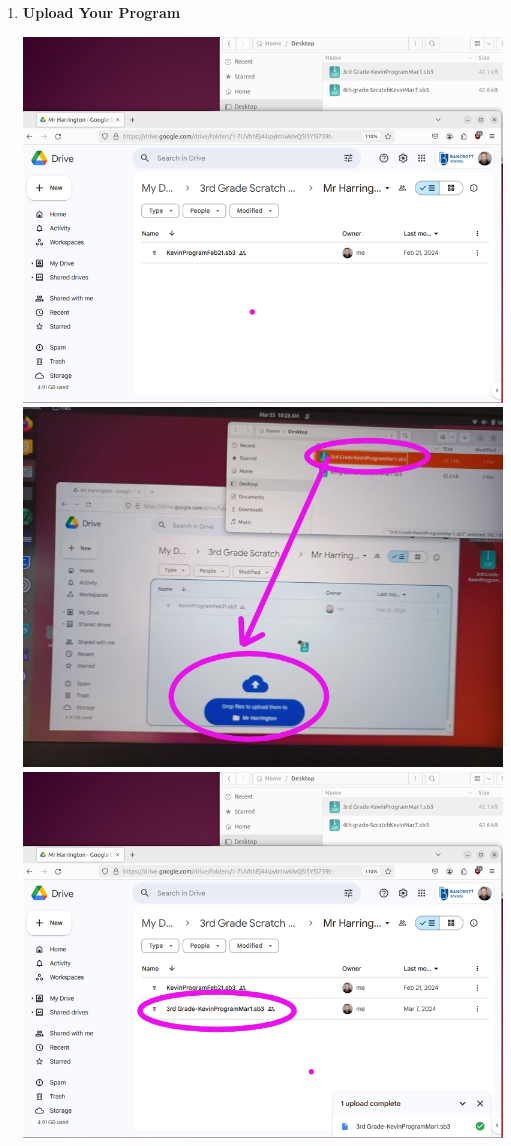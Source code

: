 \documentclass{article}
\begin{document}
\begin{enumerate}
\item {\large \textbf{Upload Your Program}}

\centerline{ \includegraphics[scale=.20]{10.png} \includegraphics[scale=.20]{11.jpg}
	\includegraphics[scale=.20]{12.png} }
	
\end{enumerate}		
\end{document}
